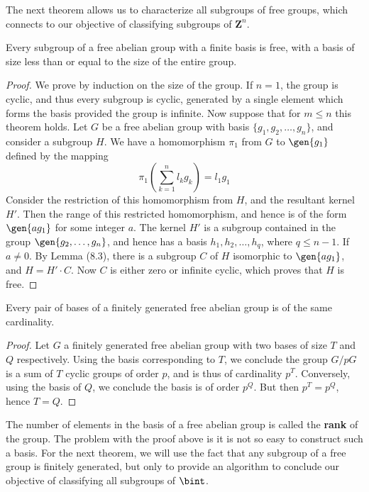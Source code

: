 The next theorem allows us to characterize all subgroups of free groups, which connects to our objective of classifying subgroups of $\mathbf{Z}^n$.

\begin{theorem}
    Every subgroup of a free abelian group with a finite basis is free, with a basis of size less than or equal to the size of the entire group.
\end{theorem}
\begin{proof}
    We prove by induction on the size of the group. If $n = 1$, the group is cyclic, and thus every subgroup is cyclic, generated by a single element which forms the basis provided the group is infinite. Now suppose that for $m \leq n$ this theorem holds. Let $G$ be a free abelian group with basis $\{ g_1, g_2, \dots, g_n \}$, and consider a subgroup $H$. We have a homomorphism $\pi_1$ from $G$ to $\gen{g_1}$ defined by the mapping
    \[ \pi_1(\sum_{k = 1}^n l_kg_k) = l_1g_1 \]
    Consider the restriction of this homomorphism from $H$, and the resultant kernel $H'$. Then the range of this restricted homomorphism, and hence is of the form $\gen{ag_1}$ for some integer $a$. The kernel $H'$ is a subgroup contained in the group $\gen{g_2, \dots, g_n}$, and hence has a basis $h_1, h_2, \dots, h_q$, where $q \leq n-1$. If $a \neq 0$. By Lemma (8.3), there is a subgroup $C$ of $H$ isomorphic to $\gen{ag_1}$, and $H = H' \cdotp C$. Now $C$ is either zero or infinite cyclic, which proves that $H$ is free.
\end{proof}

\begin{corollary}
    Every pair of bases of a finitely generated free abelian group is of the same cardinality.
\end{corollary}
\begin{proof}
    Let $G$ a finitely generated free abelian group with two bases of size $T$ and $Q$ respectively. Using the basis corresponding to $T$, we conclude the group $G/pG$ is a sum of $T$ cyclic groups of order $p$, and is thus of cardinality $p^T$. Conversely, using the basis of $Q$, we conclude the basis is of order $p^Q$. But then $p^T = p^Q$, hence $T = Q$.
\end{proof}

The number of elements in the basis of a free abelian group is called the {\bf rank} of the group. The problem with the proof above is it is not so easy to construct such a basis. For the next theorem, we will use the fact that any subgroup of a free group is finitely generated, but only to provide an algorithm to conclude our objective of classifying all subgroups of $\bint$.


